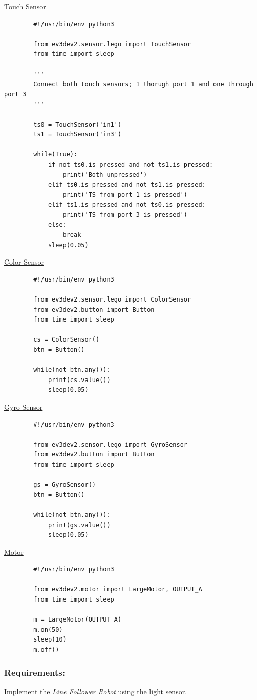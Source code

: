 \documentclass{scrartcl}
\begin{document}
\underline{Touch Sensor}
    \begin{lstlisting}
        #!/usr/bin/env python3

        from ev3dev2.sensor.lego import TouchSensor
        from time import sleep
        
        '''
        Connect both touch sensors; 1 thorugh port 1 and one through port 3
        '''
        
        ts0 = TouchSensor('in1')
        ts1 = TouchSensor('in3')
        
        while(True):
            if not ts0.is_pressed and not ts1.is_pressed:
                print('Both unpressed')
            elif ts0.is_pressed and not ts1.is_pressed:
                print('TS from port 1 is pressed')
            elif ts1.is_pressed and not ts0.is_pressed:
                print('TS from port 3 is pressed')
            else:
                break
            sleep(0.05)
    \end{lstlisting}
    
\underline{Color Sensor}
    \begin{lstlisting}
        #!/usr/bin/env python3

        from ev3dev2.sensor.lego import ColorSensor
        from ev3dev2.button import Button
        from time import sleep
        
        cs = ColorSensor()
        btn = Button()
        
        while(not btn.any()):
            print(cs.value())
            sleep(0.05)
    \end{lstlisting}
    
\underline{Gyro Sensor}
    \begin{lstlisting}
        #!/usr/bin/env python3

        from ev3dev2.sensor.lego import GyroSensor
        from ev3dev2.button import Button
        from time import sleep
        
        gs = GyroSensor()
        btn = Button()
        
        while(not btn.any()):
            print(gs.value())
            sleep(0.05)
    \end{lstlisting}
    
\underline{Motor}
    \begin{lstlisting}
        #!/usr/bin/env python3

        from ev3dev2.motor import LargeMotor, OUTPUT_A
        from time import sleep
        
        m = LargeMotor(OUTPUT_A)
        m.on(50)
        sleep(10)
        m.off()
    \end{lstlisting}

\subsubsection{Requirements:}
 Implement the \textit{Line Follower Robot} using the light sensor.
 \newpage
 
\end{document}
